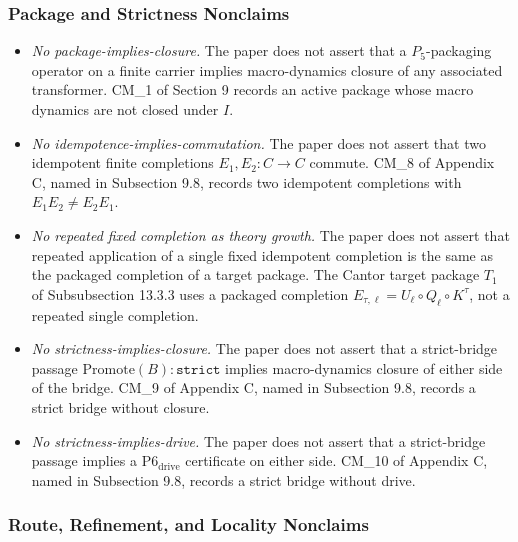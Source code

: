 \documentclass[11pt]{article}
\providecommand{\tightlist}{}
\theoremstyle{definition}
\begin{document}
\subsubsection{Package and Strictness Nonclaims}

\begin{itemize}
\tightlist
\item
  \emph{No package-implies-closure.} The paper does not assert that a \(P_{5}\)-packaging operator on a finite carrier implies macro-dynamics closure of any associated transformer. CM\_1 of Section 9 records an active package whose macro dynamics are not closed under \(I\).
\item
  \emph{No idempotence-implies-commutation.} The paper does not assert that two idempotent finite completions \(E_{1},E_{2}:C\to C\) commute. CM\_8 of Appendix C, named in Subsection 9.8, records two idempotent completions with \(E_{1}E_{2}\neq E_{2}E_{1}\).
\item
  \emph{No repeated fixed completion as theory growth.} The paper does not assert that repeated application of a single fixed idempotent completion is the same as the packaged completion of a target package. The Cantor target package \(T_{1}\) of Subsubsection 13.3.3 uses a packaged completion \(E_{\tau,\ell}=U_{\ell}\circ Q_{\ell}\circ K^{\tau}\), not a repeated single completion.
\item
  \emph{No strictness-implies-closure.} The paper does not assert that a strict-bridge passage \(\mathrm{Promote}(B):\texttt{strict}\) implies macro-dynamics closure of either side of the bridge. CM\_9 of Appendix C, named in Subsection 9.8, records a strict bridge without closure.
\item
  \emph{No strictness-implies-drive.} The paper does not assert that a strict-bridge passage implies a \(\mathrm{P6}_{\mathrm{drive}}\) certificate on either side. CM\_10 of Appendix C, named in Subsection 9.8, records a strict bridge without drive.
\end{itemize}

\subsubsection{Route, Refinement, and Locality Nonclaims}
\end{document}
